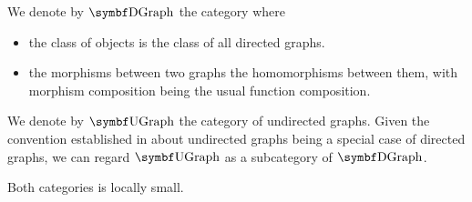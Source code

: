 \begin{definition}\label{def:category_of_graphs}
  We denote by \( \Cat{DGraph} \) the category where
  \begin{itemize}
    \item the class of objects is the class of all directed graphs.
    \item the morphisms between two graphs the homomorphisms between them, with morphism composition being the usual function composition.
  \end{itemize}

  We denote by \( \Cat{UGraph} \) the category of undirected graphs. Given the convention established in  about undirected graphs being a special case of directed graphs, we can regard \( \Bold{UGraph} \) as a subcategory of \( \Bold{DGraph} \).

  Both categories is locally small.
\end{definition}
